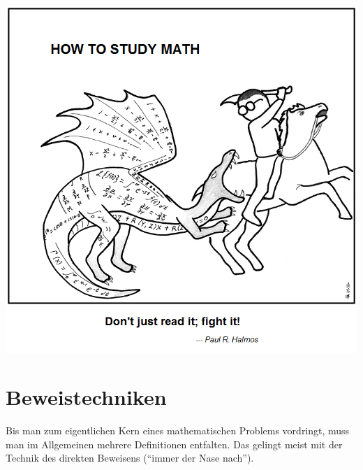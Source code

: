 \documentclass[12pt,a4paper,ngerman]{scrartcl}
\theoremstyle{definition}
\theoremstyle{plain}
\theoremstyle{remark}
\begin{document}
\begin{center}\includegraphics[scale=0.8]{saint_curious_george.png}\end{center}
\vfill
{}
\newpage


\section*{Beweistechniken}

Bis man zum eigentlichen Kern eines mathematischen Problems vordringt, muss man
im Allgemeinen mehrere Definitionen entfalten. Das gelingt meist mit der
Technik des direkten Beweisens ("`immer der Nase nach"').
\end{document}
